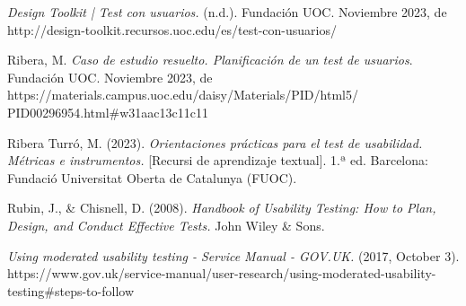 \documentclass[spanish]{article}
\begin{document}
\begin{thebibliography}{X}

\item \textit{Design Toolkit | Test con usuarios.} (n.d.).
Fundación UOC. Noviembre 2023, de
http://design-toolkit.recursos.uoc.edu/es/test-con-usuarios/

\item Ribera, M. \textit{Caso de estudio resuelto.
Planificación de un test de usuarios}. Fundación UOC.
Noviembre 2023, de
https://materials.campus.uoc.edu/daisy/Materials/PID/html5/
PID\textunderscore 00296954.html\#w31aac13c11c11

\item Ribera Turró, M. (2023). \textit{Orientaciones
prácticas para el test de usabilidad. Métricas e
instrumentos.} [Recursi de
aprendizaje textual]. 1.ª ed. Barcelona: Fundació
Universitat Oberta de Catalunya (FUOC).

\item Rubin, J., \& Chisnell, D. (2008). \textit{Handbook of
Usability Testing: How to Plan, Design, and Conduct
Effective Tests.} John Wiley \& Sons.

\item \textit{Using moderated usability testing - Service
Manual - GOV.UK.} (2017, October 3).
https://www.gov.uk/service-manual/user-research/using-moderated-usability-testing\#steps-to-follow

\end{thebibliography}
\end{document}

